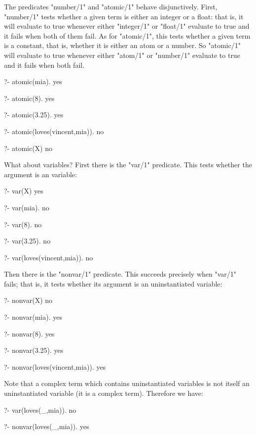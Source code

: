 The predicates "number/1" and "atomic/1" behave disjunctively.  First,
"number/1" tests whether a given term is either an integer or a float:
that is, it will evaluate to true whenever either "integer/1" or
"float/1" evaluate to true and it fails when both of them fail.  As
for "atomic/1", this tests whether a given term is a constant, that
is, whether it is either an atom or a number. So "atomic/1" will
evaluate to true whenever either "atom/1" or "number/1" evaluate to
true and it fails when both fail.

\begin{LPNcodedisplay}
?- atomic(mia).
yes

?- atomic(8).
yes

?- atomic(3.25).
yes

?- atomic(loves(vincent,mia)).
no

?- atomic(X)
no
\end{LPNcodedisplay}

What about variables?  First there is the "var/1" predicate. This
tests whether the argument is an  variable:
\begin{LPNcodedisplay}
?- var(X)
yes

?- var(mia).
no

?- var(8).
no

?- var(3.25).
no

?- var(loves(vincent,mia)).
no
\end{LPNcodedisplay}

Then there is the "nonvar/1" predicate. This succeeds precisely when
"var/1" fails; that is, it tests whether its argument is 
an uninstantiated variable:
\begin{LPNcodedisplay}
?- nonvar(X)
no

?- nonvar(mia).
yes

?- nonvar(8).
yes

?- nonvar(3.25).
yes

?- nonvar(loves(vincent,mia)).
yes
\end{LPNcodedisplay}

Note that a complex term which contains uninstantiated variables is
not itself an uninstantiated variable (it is a  complex
term). Therefore we have:

\begin{LPNcodedisplay}
?- var(loves(_,mia)).
no

?- nonvar(loves(_,mia)).
yes
\end{LPNcodedisplay}

